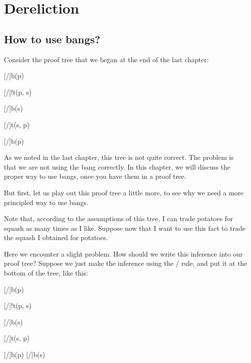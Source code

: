 \documentclass[../../../main.tex]{subfiles}
\begin{document}
\chapter{Dereliction}


\section{How to use bangs?}

Consider the proof tree that we began at the end of the last chapter:

\begin{prooftree*}
  \hypo{}
  [\startrule/]{b(p)}
  
  \hypo{}
  [\startrule/]{!t(p, s)}
  
  [\traderule/]{b(s)}
  
  \hypo{}
  [\startrule/]{t(s, p)}
  
  [\traderule/]{b(p)}
  
\end{prooftree*}

\noindent
As we noted in the last chapter, this tree is not quite correct. The problem is that we are not using the bang correctly. In this chapter, we will discuss the proper way to use bangs, once you have them in a proof tree. 

But first, let us play out this proof tree a little more, to see why we need a more principled way to use bangs.

Note that, according to the assumptions of this tree, I can trade potatoes for squash as many times as I like. Suppose now that I want to use this fact to trade the squash I obtained for potatoes. 

Here we encounter a slight problem. How should we write this inference into our proof tree? Suppose we just make the inference using the \traderule/ rule, and put it at the bottom of the tree, like this:

\begin{prooftree*}
  \hypo{}
  [\startrule/]{b(p)}
  
  \hypo{}
  [\startrule/]{!t(p, s)}
  
  [\traderule/]{b(s)}
  
  \hypo{}
  [\startrule/]{t(s, p)}
  
  [\traderule/]{b(p)}
  [\traderule/]{b(s)}
  
\end{prooftree*}
\end{document}
